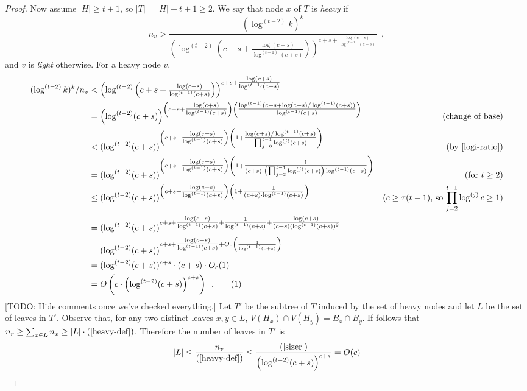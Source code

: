 \documentclass[kpfonts]{patmorin}
\newcommand\numberthis{\addtocounter{equation}{1}\tag{\theequation}}
\theoremstyle{named}
\begin{document}
\begin{proof}
    Now assume $|H|\ge t+1$, so $|T|=|H|-t+1\ge 2$.  We say that node $x$ of $T$ is \emph{heavy} if
    \begin{equation}
        n_v > \frac{(\log^{(t-2)} k)^k}{\left(\log^{(t-2)}\left(c+s+\tfrac{\log(c+s)}{\log^{(t-1)}(c+s)}\right)\right)^{c+s+\tfrac{\log(c+s)}{\log^{(t-1)}(c+s)}}} \enspace , \label{heavy-def}
    \end{equation}
    and $v$ is \emph{light} otherwise.  For a heavy node $v$,
    \begin{align*}
        (\log^{(t-2)} k)^k/n_v & < \left(\log^{(t-2)}\left(c+s+\tfrac{\log(c+s)}{\log^{(t-1)}(c+s)}\right)\right)^{c+s+\tfrac{\log(c+s)}{\log^{(t-1)}(c+s)}} \\
        & = \left(\log^{(t-2)}(c+s)\right)^{\left(c+s+\tfrac{\log(c+s)}{\log^{(t-1)}(c+s)}\right)
            \left(\tfrac{\log^{(t-1)}(c+s+\log(c+s)/\log^{(t-1)}(c+s))}{\log^{(t-1)}(c+s)}\right)} & \text{(change of base)} \\
        & < (\log^{(t-2)}(c+s))^{\left(c+s+\tfrac{\log(c+s)}{\log^{(t-1)}(c+s)}\right)
            \left(1 + \tfrac{\log(c+s)/\log^{(t-1)}(c+s)}{\prod_{j=0}^{t-1}\log^{(j)}(c+s)}\right)}
            & \text{(by \cref{logi-ratio})}\\
        & = (\log^{(t-2)}(c+s))^{\left(c+s+\tfrac{\log(c+s)}{\log^{(t-1)}(c+s)}\right)
            \left(1 + \tfrac{1}{(c+s)\cdot\left(\prod_{j=2}^{t-1}\log^{(j)}(c+s)\right)\log^{(t-1)}(c+s)}\right)} &
            \text{(for $t\ge 2$)}\\
        & \le (\log^{(t-2)}(c+s))^{\left(c+s+\tfrac{\log(c+s)}{\log^{(t-1)}(c+s)}\right)
            \left(1 + \tfrac{1}{(c+s)\cdot \log^{(t-1)}(c+s)}\right)}
            & \text{($c\ge \tau(t-1)$, so $\prod_{j=2}^{t-1}\log^{(j)}c\ge 1$)} \\
        & = (\log^{(t-2)}(c+s))^{c+s+\tfrac{\log(c+s)}{\log^{(t-1)}(c+s)} +
            \tfrac{1}{\log^{(t-1)}(c+s)} + \tfrac{\log(c+s)}{(c+s)(\log^{(t-1)}(c+s))^2}}  \\
        & = (\log^{(t-2)}(c+s))^{c+s+\tfrac{\log(c+s)}{\log^{(t-1)}(c+s)} + O_c\left(\frac{1}{\log^{(t-1)}(c+s)}\right)}  \\
        & = (\log^{(t-2)}(c+s))^{c+s}\cdot (c+s)\cdot O_c(1) \\
        & = O\left(c\cdot\left(\log^{(t-2)}(c+s)\right)^{c+s}\right) \enspace .
        \numberthis \label{sizer}
    \end{align*}
    [TODO: Hide comments once we've checked everything.]
    Let $T'$ be the subtree of $T$ induced by the set of heavy nodes and let $L$ be the set of leaves in $T'$.  Observe that, for any two distinct leaves $x,y\in L$, $V(H_x)\cap V(H_y)=B_x\cap B_y$.  If follows that $n_r\ge \sum_{x\in L} n_x\ge |L|\cdot(\ref{heavy-def})$.  Therefore the number of leaves in $T'$ is
    \[
        |L| \le \frac{n_v}{(\ref{heavy-def})} \le \frac{(\ref{sizer})}{\left(\log^{(t-2)}(c+s)\right)^{c+s}} = O(c)
    \]


\end{proof}
\end{document}
